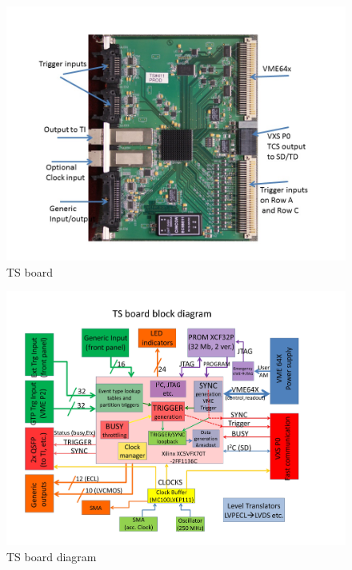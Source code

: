 \begin{figure}[hbt]
	\centering
	\includegraphics[width=1.0\columnwidth,keepaspectratio]{img/TSused.jpg}
	\caption{TS board}
	\label{fig:TSused}
\end{figure}

\begin{figure}[hbt]
	\centering
	\includegraphics[width=1.0\columnwidth,keepaspectratio]{img/TSdiagram.jpg}
	\caption{TS board diagram}
	\label{fig:TSdiagram}
\end{figure}

